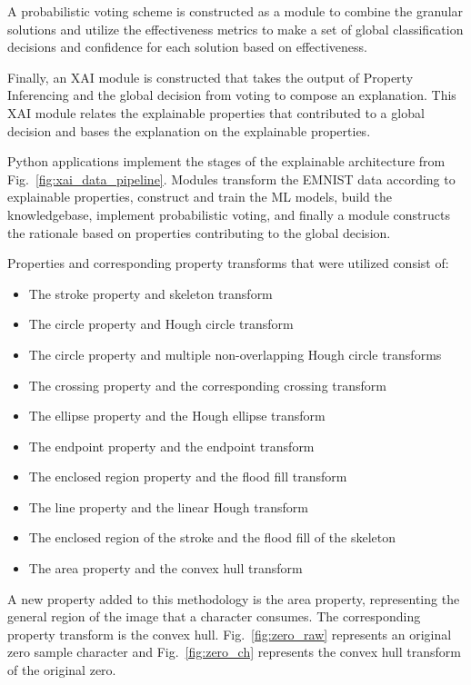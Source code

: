 \documentclass[conference]{IEEEtran}
\begin{document}
A probabilistic voting scheme is constructed as a module to combine the granular
solutions and utilize the effectiveness metrics to make a set of
global classification decisions and confidence for each solution based on
effectiveness.

Finally, an XAI module is constructed that takes the output of Property
Inferencing and the global decision from voting to compose an explanation.
This XAI module relates the explainable properties that contributed to a global
decision and bases the explanation on the explainable properties.

Python applications implement the stages of the explainable architecture from
Fig.~\ref{fig:xai_data_pipeline}. Modules transform the EMNIST data according to
explainable properties, construct and train the ML models, build the
knowledgebase, implement probabilistic voting, and finally a module
constructs the rationale based on properties contributing to the global
decision.

Properties and corresponding property transforms that were utilized consist of:
\begin{itemize}
    \item The stroke property and skeleton transform
    \item The circle property and Hough circle transform
    \item The circle property and multiple non-overlapping Hough circle transforms
    \item The crossing property and the corresponding crossing transform
    \item The ellipse property and the Hough ellipse transform
    \item The endpoint property and the endpoint transform
    \item The enclosed region property and the flood fill transform
    \item The line property and the linear Hough transform
    \item The enclosed region of the stroke and the flood fill of the skeleton
    \item The area property and the convex hull transform
\end{itemize}

A new property added to this methodology is the area property, representing the
general region of the image that a character consumes. The corresponding
property transform is the convex hull. Fig.~\ref{fig:zero_raw} represents an
original zero sample character and Fig.~\ref{fig:zero_ch} represents the convex
hull transform of the original zero.
\end{document}
